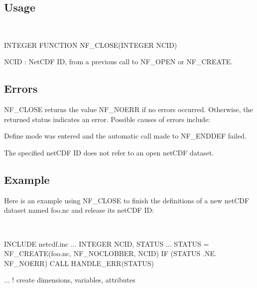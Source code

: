 \subsection*{Usage }

 

I\+N\+T\+E\+G\+ER F\+U\+N\+C\+T\+I\+ON N\+F\+\_\+\+C\+L\+O\+S\+E(\+I\+N\+T\+E\+G\+E\+R N\+C\+I\+D)

{\ttfamily N\+C\+ID} \+: Net\+C\+DF ID, from a previous call to N\+F\+\_\+\+O\+P\+EN or N\+F\+\_\+\+C\+R\+E\+A\+TE.

\subsection*{Errors }

N\+F\+\_\+\+C\+L\+O\+SE returns the value N\+F\+\_\+\+N\+O\+E\+RR if no errors occurred. Otherwise, the returned status indicates an error. Possible causes of errors include\+:


\begin{DoxyItemize}
\item Define mode was entered and the automatic call made to N\+F\+\_\+\+E\+N\+D\+D\+EF failed.
\item The specified net\+C\+DF ID does not refer to an open net\+C\+DF dataset.
\end{DoxyItemize}

\subsection*{Example }

Here is an example using N\+F\+\_\+\+C\+L\+O\+SE to finish the definitions of a new net\+C\+DF dataset named foo.\+nc and release its net\+C\+DF ID\+:

 

I\+N\+C\+L\+U\+DE \textquotesingle{}netcdf.\+inc\textquotesingle{} ... I\+N\+T\+E\+G\+ER N\+C\+ID, S\+T\+A\+T\+US ... S\+T\+A\+T\+US = N\+F\+\_\+\+C\+R\+E\+A\+TE(\textquotesingle{}foo.\+nc\textquotesingle{}, N\+F\+\_\+\+N\+O\+C\+L\+O\+B\+B\+ER, N\+C\+ID) IF (S\+T\+A\+T\+US .NE. N\+F\+\_\+\+N\+O\+E\+RR) C\+A\+LL H\+A\+N\+D\+L\+E\+\_\+\+E\+R\+R(\+S\+T\+A\+T\+U\+S)

... ! create dimensions, variables, attributes

